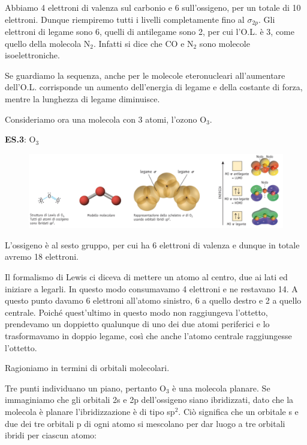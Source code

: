 Abbiamo 4 elettroni di valenza sul carbonio e 6 sull'ossigeno, per un totale di 10 elettroni. Dunque riempiremo tutti i livelli completamente fino al $\sigma_{2p}$. Gli elettroni di legame sono 6, quelli di antilegame sono 2, per cui l'O.L. è 3, come quello della molecola N$_2$. Infatti si dice che CO e N$_2$ sono molecole isoelettroniche.

Se guardiamo la sequenza, anche per le molecole eteronucleari all'aumentare dell'O.L. corrisponde un aumento dell'energia di legame e della costante di forza, mentre la lunghezza di legame diminuisce.

\vspace{0.2cm}Consideriamo ora una molecola con 3 atomi, l'ozono O$_3$.

\vspace{0.2cm}\textbf{ES.3}: O$_3$

\begin{figure}[H]
    \centering
    \includegraphics[width=14cm]{immagini/orbitali_molecolari_O_3.png}
\end{figure}

L'ossigeno è al sesto gruppo, per cui ha 6 elettroni di valenza e dunque in totale avremo 18 elettroni.

Il formalismo di Lewis ci diceva di mettere un atomo al centro, due ai lati ed iniziare a legarli. In questo modo consumavamo 4 elettroni e ne restavano 14. A questo punto davamo 6 elettroni all'atomo sinistro, 6 a quello destro e 2 a quello centrale. Poiché quest'ultimo in questo modo non raggiungeva l'ottetto, prendevamo un doppietto qualunque di uno dei due atomi periferici e lo trasformavamo in doppio legame, così che anche l'atomo centrale raggiungesse l'ottetto.

Ragioniamo in termini di orbitali molecolari.

Tre punti individuano un piano, pertanto O$_3$ è una molecola planare. Se immaginiamo che gli orbitali 2s e 2p dell'ossigeno siano ibridizzati, dato che la molecola è planare l'ibridizzazione è di tipo sp$^2$. Ciò significa che un orbitale s e due dei tre orbitali p di ogni atomo si mescolano per dar luogo a tre orbitali ibridi per ciascun atomo:

